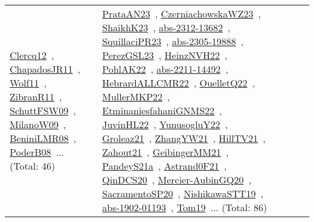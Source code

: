 {\begin{longtable}{lp{3cm}>{\raggedright\arraybackslash}p{6cm}>{\raggedright\arraybackslash}p{6cm}>{\raggedright\arraybackslash}p{8cm}}
\href{works/Clercq12.pdf}{Clercq12}~\cite{Clercq12}, \href{works/ChapadosJR11.pdf}{ChapadosJR11}~\cite{ChapadosJR11}, \href{works/Wolf11.pdf}{Wolf11}~\cite{Wolf11}, \href{works/ZibranR11.pdf}{ZibranR11}~\cite{ZibranR11}, \href{works/SchuttFSW09.pdf}{SchuttFSW09}~\cite{SchuttFSW09}, \href{works/MilanoW09.pdf}{MilanoW09}~\cite{MilanoW09}, \href{works/BeniniLMR08.pdf}{BeniniLMR08}~\cite{BeniniLMR08}, \href{works/PoderB08.pdf}{PoderB08}~\cite{PoderB08}... (Total: 46) & \href{works/PrataAN23.pdf}{PrataAN23}~\cite{PrataAN23}, \href{works/CzerniachowskaWZ23.pdf}{CzerniachowskaWZ23}~\cite{CzerniachowskaWZ23}, \href{works/ShaikhK23.pdf}{ShaikhK23}~\cite{ShaikhK23}, \href{works/abs-2312-13682.pdf}{abs-2312-13682}~\cite{abs-2312-13682}, \href{works/SquillaciPR23.pdf}{SquillaciPR23}~\cite{SquillaciPR23}, \href{works/abs-2305-19888.pdf}{abs-2305-19888}~\cite{abs-2305-19888}, \href{works/PerezGSL23.pdf}{PerezGSL23}~\cite{PerezGSL23}, \href{works/HeinzNVH22.pdf}{HeinzNVH22}~\cite{HeinzNVH22}, \href{works/PohlAK22.pdf}{PohlAK22}~\cite{PohlAK22}, \href{works/abs-2211-14492.pdf}{abs-2211-14492}~\cite{abs-2211-14492}, \href{works/HebrardALLCMR22.pdf}{HebrardALLCMR22}~\cite{HebrardALLCMR22}, \href{works/OuelletQ22.pdf}{OuelletQ22}~\cite{OuelletQ22}, \href{works/MullerMKP22.pdf}{MullerMKP22}~\cite{MullerMKP22}, \href{works/EtminaniesfahaniGNMS22.pdf}{EtminaniesfahaniGNMS22}~\cite{EtminaniesfahaniGNMS22}, \href{works/JuvinHL22.pdf}{JuvinHL22}~\cite{JuvinHL22}, \href{works/YunusogluY22.pdf}{YunusogluY22}~\cite{YunusogluY22}, \href{works/Groleaz21.pdf}{Groleaz21}~\cite{Groleaz21}, \href{works/ZhangYW21.pdf}{ZhangYW21}~\cite{ZhangYW21}, \href{works/HillTV21.pdf}{HillTV21}~\cite{HillTV21}, \href{works/Zahout21.pdf}{Zahout21}~\cite{Zahout21}, \href{works/GeibingerMM21.pdf}{GeibingerMM21}~\cite{GeibingerMM21}, \href{works/PandeyS21a.pdf}{PandeyS21a}~\cite{PandeyS21a}, \href{works/Astrand0F21.pdf}{Astrand0F21}~\cite{Astrand0F21}, \href{works/QinDCS20.pdf}{QinDCS20}~\cite{QinDCS20}, \href{works/Mercier-AubinGQ20.pdf}{Mercier-AubinGQ20}~\cite{Mercier-AubinGQ20}, \href{works/SacramentoSP20.pdf}{SacramentoSP20}~\cite{SacramentoSP20}, \href{works/NishikawaSTT19.pdf}{NishikawaSTT19}~\cite{NishikawaSTT19}, \href{works/abs-1902-01193.pdf}{abs-1902-01193}~\cite{abs-1902-01193}, \href{works/Tom19.pdf}{Tom19}~\cite{Tom19}... (Total: 86)\\

\end{longtable}}
